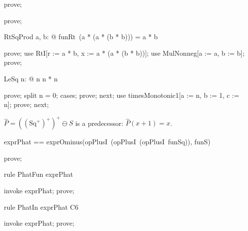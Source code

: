\documentclass{article}
\begin{document}
\begin{zproof}
prove;
\end{zproof}


\begin{zproof}
prove;
\end{zproof}

\begin{theorem}{RtSqProd}
  \forall a, b: \nat @ funRt~(a * (a * (b * b))) = a * b
\end{theorem}

\begin{zproof}
prove;
use RtI[r := a * b, x := a * (a * (b * b))];
use MulNonneg[a := a, b := b];
prove;
\end{zproof}

\begin{theorem}{LeSq}
  \forall n: \nat @ n \leq n * n
\end{theorem}

\begin{zproof}
prove;
split n = 0;
cases;
prove;
next;
use timesMonotonic1[a := n, b := 1, c := n];
prove;
next;
\end{zproof}

$\hat P = ((\mathrm{Sq}^+)^+)^+ \ominus S$ is a predecessor: $\hat P(x+1) = x$.

\begin{zed}
  exprPhat == exprOminus(opPlusI~(opPlusI~(opPlusI~funSq)), funS)
\end{zed}

\begin{zproof}
prove;
\end{zproof}

\begin{theorem}{rule PhatFun}
  exprPhat \in \nat \fun \nat
\end{theorem}

\begin{zproof}
invoke exprPhat;
prove;
\end{zproof}

\begin{theorem}{rule PhatIn}
  exprPhat \in C6
\end{theorem}

\begin{zproof}
invoke exprPhat;
prove;
\end{zproof}
\end{document}

